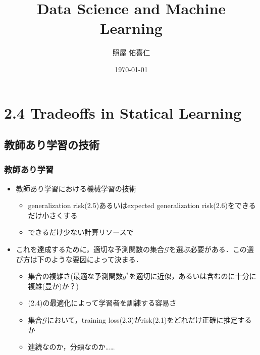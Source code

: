 \documentclass[dvipdfmx,cjk]{beamer}
\theoremstyle{example}
\begin{document}
\title[]{Data Science and Machine Learning}
\author[]{照屋 佑喜仁}
\institute[]{}
\date{\today}

\begin{frame}
    \titlepage
\end{frame}

\begin{frame}
    \tableofcontents
\end{frame}

\section{2.4 Tradeoffs in Statical Learning}
\subsection{教師あり学習の技術}
\begin{frame}
    \frametitle{教師あり学習}
    \begin{itemize}
        \item 教師あり学習における機械学習の技術
              \begin{itemize}
                  \item generalization risk(2.5)あるいはexpected generalization risk(2.6)をできるだけ小さくする
                  \item できるだけ少ない計算リソースで
              \end{itemize}
        \item これを達成するために，適切な予測関数の集合$\mathcal{G}$を選ぶ必要がある．この選び方は下のような要因によって決まる．
              \begin{itemize}
                  \item 集合の複雑さ(最適な予測関数$g^*$を適切に近似，あるいは含むのに十分に複雑(豊か)か？)
                  \item (2.4)の最適化によって学習者を訓練する容易さ
                  \item 集合$\mathcal{G}$において，training loss(2.3)がrisk(2.1)をどれだけ正確に推定するか
                  \item 連続なのか，分類なのか……
              \end{itemize}
    \end{itemize}
\end{frame}
\end{document}
